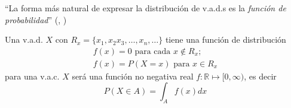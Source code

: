 
\begin{displayquote}
``La forma más natural de expresar la distribución de v.a.d.s es la \emph{función de probabilidad}'' (\citeauthor{blitz19}, \citeyear{blitz19})
\end{displayquote}
Una v.a.d. $X$ con $R_x=\{x_1,x_2x_3,\ldots,x_n,\ldots\}$ tiene una función de distribución
\begin{equation}
\begin{matrix}
f(x)=0\text{ para cada }x \notin R_x\text{;}\\
f(x)=P(X=x)\text{ para } x\in R_x
\end{matrix}\label{eq:FP}
\end{equation}
para una v.a.c. $X$ será una función no negativa real $f:\mathbb{R}\mapsto[0,\infty)$, es decir
\begin{equation}
P(X\in A)=\int_{A}f(x)dx
\end{equation}
